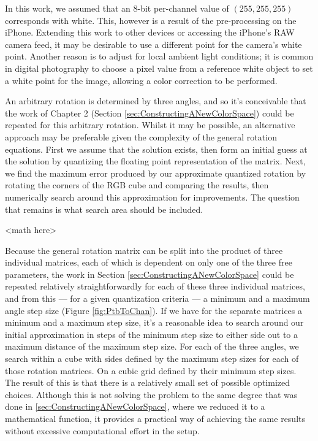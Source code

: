 In this work, we assumed that an 8-bit per-channel value of $(255, 255, 255)$ corresponds with white. This, however is a result of the pre-processing on the iPhone. Extending this work to other devices or accessing the iPhone's RAW camera feed, it may be desirable to use a different point for the camera's white point. Another reason is to adjust for local ambient light conditions; it is common in digital photography to choose a pixel value from a reference white object to set a white point for the image, allowing a color correction to be performed.

An arbitrary rotation is determined by three angles, and so it's conceivable that the work of Chapter 2 (Section \ref{sec:ConstructingANewColorSpace}) could be repeated for this arbitrary rotation. Whilst it may be possible, an alternative approach may be preferable given the complexity of the general rotation equations. First we assume that the solution exists, then form an initial guess at the solution by quantizing the floating point representation of the matrix. Next, we find the maximum error produced by our approximate quantized rotation by rotating the corners of the RGB cube and comparing the results, then numerically search around this approximation for improvements. The question that remains is what search area should be included.

<math here>

Because the general rotation matrix can be split into the product of three individual matrices, each of which is dependent on only one of the three free parameters, the work in Section \ref{sec:ConstructingANewColorSpace} could be repeated relatively straightforwardly for each of these three individual matrices, and from this --- for a given quantization criteria --- a minimum and a maximum angle step size (Figure \ref{fig:PtbToChan}). If we have for the separate matrices a minimum and a maximum step size, it's a reasonable idea to search around our initial approximation in steps of the minimum step size to either side out to a maximum distance of the maximum step size. For each of the three angles, we search within a cube with sides defined by the maximum step sizes for each of those rotation matrices. On a cubic grid defined by their minimum step sizes. The result of this is that there is a relatively small set of possible optimized choices. Although this is not solving the problem to the same degree that was done in \ref{sec:ConstructingANewColorSpace}, where we reduced it to a mathematical function, it provides a practical way of achieving the same results without excessive computational effort in the setup. 

